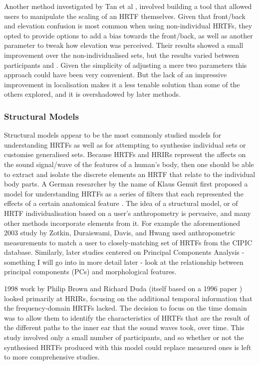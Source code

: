 Another method investigated by Tan et al \citep{Tan1998}, involved building a tool that allowed users to manipulate the scaling of an HRTF themselves. Given that front/back and elevation confusion is most common when using non-individual HRTFs, they opted to provide options to add a bias towards the front/back, as well as another parameter to tweak how elevation was perceived. Their results showed a small improvement over the non-individualised sets, but the results varied between participants and . Given the simplicity of adjusting a mere two parameters this approach could have been very convenient. But the lack of an impressive improvement in localisation makes it a less tenable solution than some of the others explored, and it is overshadowed by later methods. 

\subsubsection{Structural Models}
Structural models appear to be the most commonly studied models for understanding HRTFs as well as for attempting to synthesise individual sets or customise generalised sets\citep{seminal paper}.  Because HRTFs and HRIRs represent the affects on the sound signal/wave of the features of a human's body, then one should be able to extract and isolate the discrete elements an HRTF that relate to the individual body parts. A German researcher by the name of Klaus Genuit first proposed a model for understanding HRTFs as a series of filters that each represented the effects of a certain anatomical feature \citep{Genuit1984}. The idea of a structural model, or of HRTF individualisation based on a user's anthropometry is pervasive, and many other methods incorporate elements from it. For example the aforementioned 2003 study by Zotkin, Duraiswami, Davis, and Hwang  \citep{Duraiswami2003} used anthropometric measurements to match a user to closely-matching set of HRTFs from the CIPIC database. Similarly, later studies centered on Principal Components Analysis - something I will go into in more detail later - look at the relationship between principal components (PCs) and morphological features. 

1998 work by Philip Brown and Richard Duda \citep{PhillipBrown1998} (itself based on a 1996 paper \citep{lopexmeddis1996}) looked primarily at HRIRs, focusing on the additional temporal information that the frequency-domain HRTFs lacked. The decision to focus on the time domain was to allow them to identify the characteristics of HRTFs that are the result of the different paths to the inner ear that the sound waves took, over time. This study involved only a small number of participants, and so whether or not the synthesised HRTFs produced with this model could replace measured ones is left to more comprehensive studies. 

